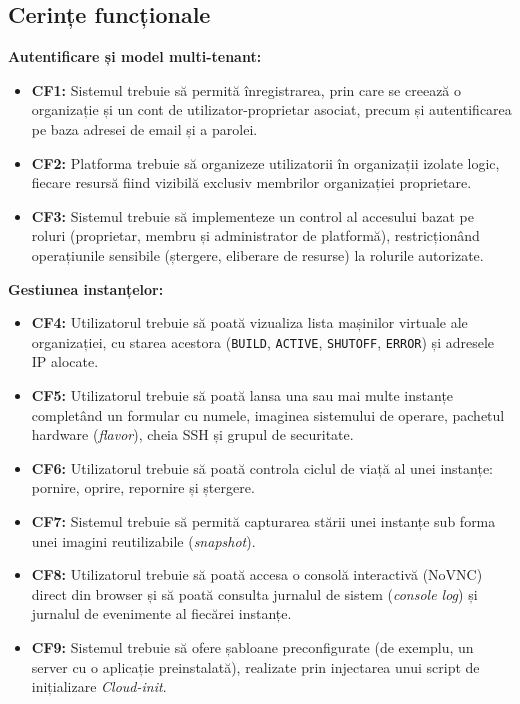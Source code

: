 \subsection{Cerințe funcționale}

\textbf{Autentificare și model multi-tenant:}
\begin{itemize}
    \item \textbf{CF1:} Sistemul trebuie să permită înregistrarea, prin care se creează o organizație și un cont de utilizator-proprietar asociat, precum și autentificarea pe baza adresei de email și a parolei.
    \item \textbf{CF2:} Platforma trebuie să organizeze utilizatorii în organizații izolate logic, fiecare resursă fiind vizibilă exclusiv membrilor organizației proprietare.
    \item \textbf{CF3:} Sistemul trebuie să implementeze un control al accesului bazat pe roluri (proprietar, membru și administrator de platformă), restricționând operațiunile sensibile (ștergere, eliberare de resurse) la rolurile autorizate.
\end{itemize}

\textbf{Gestiunea instanțelor:}
\begin{itemize}
    \item \textbf{CF4:} Utilizatorul trebuie să poată vizualiza lista mașinilor virtuale ale organizației, cu starea acestora (\texttt{BUILD}, \texttt{ACTIVE}, \texttt{SHUTOFF}, \texttt{ERROR}) și adresele IP alocate.
    \item \textbf{CF5:} Utilizatorul trebuie să poată lansa una sau mai multe instanțe completând un formular cu numele, imaginea sistemului de operare, pachetul hardware (\textit{flavor}), cheia SSH și grupul de securitate.
    \item \textbf{CF6:} Utilizatorul trebuie să poată controla ciclul de viață al unei instanțe: pornire, oprire, repornire și ștergere.
    \item \textbf{CF7:} Sistemul trebuie să permită capturarea stării unei instanțe sub forma unei imagini reutilizabile (\textit{snapshot}).
    \item \textbf{CF8:} Utilizatorul trebuie să poată accesa o consolă interactivă (NoVNC) direct din browser și să poată consulta jurnalul de sistem (\textit{console log}) și jurnalul de evenimente al fiecărei instanțe.
    \item \textbf{CF9:} Sistemul trebuie să ofere șabloane preconfigurate (de exemplu, un server cu o aplicație preinstalată), realizate prin injectarea unui script de inițializare \textit{Cloud-init}.
\end{itemize}

